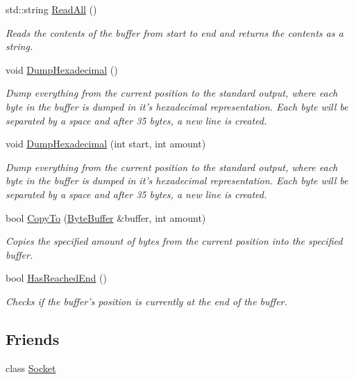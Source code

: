 \begin{DoxyCompactItemize}
std\-::string \hyperlink{class_senergy_1_1_byte_buffer_a5c3f960422533abc898061be11b6f613}{Read\-All} ()
\begin{DoxyCompactList}\small\item\em Reads the contents of the buffer from start to end and returns the contents as a string. \end{DoxyCompactList}\item 
void \hyperlink{class_senergy_1_1_byte_buffer_a475f2133734cd74c4bce78bdf09950f3}{Dump\-Hexadecimal} ()
\begin{DoxyCompactList}\small\item\em Dump everything from the current position to the standard output, where each byte in the buffer is dumped in it's hexadecimal representation. Each byte will be separated by a space and after 35 bytes, a new line is created. \end{DoxyCompactList}\item 
void \hyperlink{class_senergy_1_1_byte_buffer_a4276f5ed69bd1d2fe9c26e05193715f2}{Dump\-Hexadecimal} (int start, int amount)
\begin{DoxyCompactList}\small\item\em Dump everything from the current position to the standard output, where each byte in the buffer is dumped in it's hexadecimal representation. Each byte will be separated by a space and after 35 bytes, a new line is created. \end{DoxyCompactList}\item 
bool \hyperlink{class_senergy_1_1_byte_buffer_a2db9cbd7f2eadd1ecb561c72feaca7ad}{Copy\-To} (\hyperlink{class_senergy_1_1_byte_buffer}{Byte\-Buffer} \&buffer, int amount)
\begin{DoxyCompactList}\small\item\em Copies the specified amount of bytes from the current position into the specified buffer. \end{DoxyCompactList}\item 
bool \hyperlink{class_senergy_1_1_byte_buffer_a2747633838b3fae217b90700ff737840}{Has\-Reached\-End} ()
\begin{DoxyCompactList}\small\item\em Checks if the buffer's position is currently at the end of the buffer. \end{DoxyCompactList}\end{DoxyCompactItemize}
\subsection*{Friends}
\begin{DoxyCompactItemize}
\item 
class \hyperlink{class_senergy_1_1_byte_buffer_ab510887d735ee73ab1cb598c66260e87}{Socket}
\end{DoxyCompactItemize}


